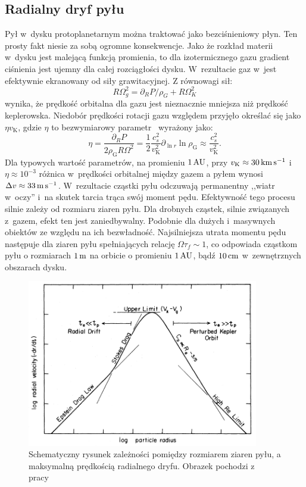 \subsection{Radialny dryf pyłu}
Pył w~dysku protoplanetarnym można traktować jako bezciśnieniowy płyn. Ten
prosty fakt niesie za sobą ogromne konsekwencje. Jako że rozkład materii w~dysku
jest malejącą funkcją promienia, to dla izotermicznego gazu gradient ciśnienia
jest ujemny dla całej rozciągłości dysku. W~rezultacie gaz w~jest efektywnie
ekranowany od siły grawitacyjnej. Z równowagi sił:
%
\begin{equation}
   R\Omega_g^2 = \partial_R P / \rho_G + R\Omega_K^2
\end{equation}
%
wynika, że prędkość orbitalna dla gazu jest nieznacznie mniejsza niż prędkość
keplerowska. Niedobór prędkości rotacji gazu względem przyjęło określać się jako
$\eta v_\textrm{K}$, gdzie $\eta$ to bezwymiarowy parametr~\cite{N86}
wyrażony jako:
%
\begin{equation}
   \label{eq:eta}
   \eta = \frac{\partial_R P}{2\rho_\textrm{G} R \Omega^2} = \frac{1}{2}
   \frac{c_s^2}{v_\textrm{K}^2} \partial_{\ln r} \ln \rho_{\textrm{G}} \approx
   \frac{c_s^2}{v_\textrm{K}^2}.
\end{equation}
%
Dla typowych wartość parametrów, na promieniu $1\hbox{$\thinspace\textrm{AU}$}$, przy $v_\textrm{K}\approx
30\hbox{$\thinspace\textrm{km}$}\hbox{$\thinspace\textrm{s}$}^{-1}$ i~$\eta \approx 10^{-3}$ różnica w~prędkości orbitalnej między
gazem a pyłem wynosi $\Delta v \approx 33\hbox{$\thinspace\textrm{m}$}\hbox{$\thinspace\textrm{s}$}^{-1}$.
W~rezultacie cząstki pyłu odczuwają permanentny ,,wiatr w~oczy'' i~na skutek
tarcia trąca swój moment pędu. Efektywność tego procesu silnie zależy od
rozmiaru ziaren pyłu. Dla drobnych cząstek, silnie związanych z~gazem, efekt ten
jest zaniedbywalny. Podobnie dla dużych i~masywnych obiektów ze względu na ich
bezwładność. Najsilniejsza utrata momentu pędu następuje dla ziaren pyłu
spełniających relację $\Omega \tau_f \sim 1$, co odpowiada cząstkom pyłu o
rozmiarach $1\hbox{$\thinspace\textrm{m}$}$ na orbicie o promieniu $1\hbox{$\thinspace\textrm{AU}$}$, bądź $10\hbox{$\thinspace\textrm{cm}$}$ w~zewnętrznych
obszarach dysku.

\begin{figure}
   \includegraphics[width=0.9\textwidth]{figures/chap1_drift.png}
   \caption{Schematyczny rysunek zależności pomiędzy rozmiarem ziaren pyłu, a
   maksymalną prędkością radialnego dryfu. Obrazek pochodzi z
   pracy~\cite{W77}}
   \label{fig:chap1_drift}
\end{figure}


